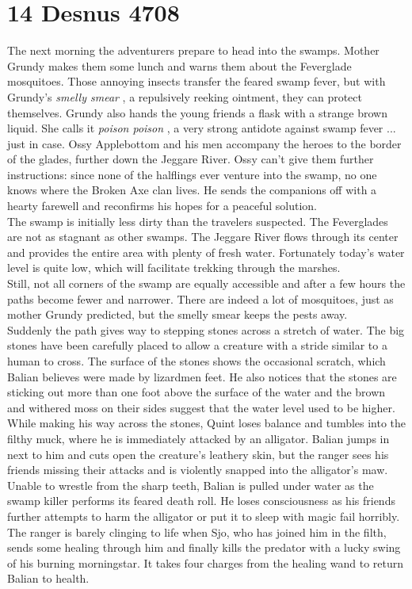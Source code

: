 \section{14 Desnus 4708}

The next morning the adventurers prepare to head into the swamps. Mother Grundy makes them some lunch and warns them about the Feverglade mosquitoes. Those annoying insects transfer the feared swamp fever, but with Grundy's {\itshape smelly smear} , a repulsively reeking ointment, they can protect themselves. Grundy also hands the young friends a flask with a strange brown liquid. She calls it  {\itshape poison poison} , a very strong antidote against swamp fever ... just in case. Ossy Applebottom and his men accompany the heroes to the border of the glades, further down the Jeggare River. Ossy can't give them further instructions: since none of the halflings ever venture into the swamp, no one knows where the Broken Axe clan lives. He sends the companions off with a hearty farewell and reconfirms his hopes for a peaceful solution.\\

The swamp is initially less dirty than the travelers suspected. The Feverglades are not as stagnant as other swamps. The Jeggare River flows through its center and provides the entire area with plenty of fresh water. Fortunately today's water level is quite low, which will facilitate trekking through the marshes.\\

Still, not all corners of the swamp are equally accessible and after a few hours the paths become fewer and narrower. There are indeed a lot of mosquitoes, just as mother Grundy predicted, but the smelly smear keeps the pests away.\\

Suddenly the path gives way to stepping stones across a stretch of water. The big stones have been carefully placed to allow a creature with a stride similar to a human to cross. The surface of the stones shows the occasional scratch, which Balian believes were made by lizardmen feet. He also notices that the stones are sticking out more than one foot above the surface of the water and the brown and withered moss on their sides suggest that the water level used to be higher.\\

While making his way across the stones, Quint loses balance and tumbles into the filthy muck, where he is immediately attacked by an alligator. Balian jumps in next to him and cuts open the creature's leathery skin, but the ranger sees his friends missing their attacks and is violently snapped into the alligator's maw. Unable to wrestle from the sharp teeth, Balian is pulled under water as the swamp killer performs its feared death roll. He loses consciousness as his friends further attempts to harm the alligator or put it to sleep with magic fail horribly. The ranger is barely clinging to life when Sjo, who has joined him in the filth, sends some healing through him and finally kills the predator with a lucky swing of his burning morningstar. It takes four charges from the healing wand to return Balian to health.\\

